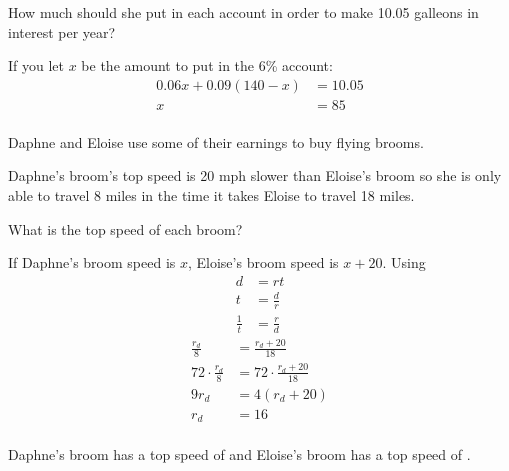 \documentclass[letterpaper, landscape]{exam}
\begin{document}
\begin{questions}
    How much should she put in each account in order to make 10.05 galleons in interest per year?

    \begin{solution}
      If you let $x$ be the amount to put in the 6\% account:
      \begin{align*}
        0.06x + 0.09( 140 - x ) & = 10.05 \\
        x                       & = \boxed{ 85 } \\
      \end{align*}
    \end{solution}





    \bonusquestion[15] 
      Daphne and Eloise use some of their earnings to buy flying brooms. 
      
      Daphne's broom's top speed is 20 mph slower than Eloise's broom so she is only able to travel
      8 miles in the time it takes Eloise to travel 18 miles. 
      
      What is the top speed of each broom?

      \ifprintanswers{}
        \newpage
      \fi

      \begin{solution}
        If Daphne's broom speed is $x$, Eloise's broom speed is $x + 20$. Using 
        \begin{align*}
          d           & = rt \\
          t           & = \frac{d}{r} \\
          \frac{1}{t} & = \frac{r}{d}
        \end{align*}
        \begin{align*}
          \frac{r_{d}}{8}          & = \frac{r_{d} + 20}{18} \\
          72 \cdot \frac{r_{d}}{8} & = 72 \cdot \frac{r_{d} + 20}{18} \\
          9r_{d}                   & = 4 (r_{d} + 20) \\
          r_{d}                    & = 16 \\
        \end{align*}

        Daphne's broom has a top speed of  and Eloise's broom
        has a top speed of .
      \end{solution}

  \end{questions}
\end{document}
